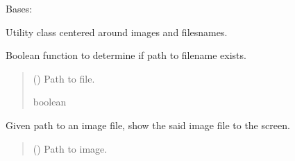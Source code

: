 \documentclass[letterpaper,10pt,english]{sphinxmanual}
\begin{document}
\begin{fulllineitems}
\label{\detokenize{comp_viz.utils:comp_viz.utils.toolbox.Tools}}
\pysigstartsignatures
{}
\pysigstopsignatures
\sphinxAtStartPar
Bases: 

\sphinxAtStartPar
Utility class centered around images and filesnames.

\begin{fulllineitems}
\label{\detokenize{comp_viz.utils:comp_viz.utils.toolbox.Tools.exists}}
\pysigstartsignatures
{}
\pysigstopsignatures
\sphinxAtStartPar
Boolean function to determine if path to filename exists.
\begin{quote}\begin{description}
\sphinxAtStartPar
{} () \textendash{} Path to file.

\sphinxAtStartPar
boolean

\end{description}\end{quote}

\end{fulllineitems}


\begin{fulllineitems}
\label{\detokenize{comp_viz.utils:comp_viz.utils.toolbox.Tools.filename_show_image}}
\pysigstartsignatures
{}
\pysigstopsignatures
\sphinxAtStartPar
Given path to an image file, show the said image file to the screen.
\begin{quote}\begin{description}
\sphinxAtStartPar
{} () \textendash{} Path to image.


\end{description}
\end{quote}
\end{fulllineitems}
\end{fulllineitems}
\end{document}

